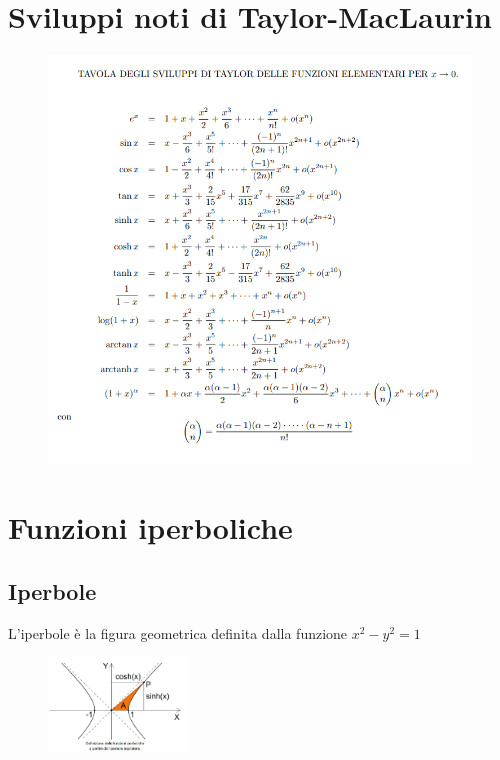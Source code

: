 \documentclass{report}
\begin{document}
\section{Sviluppi noti di Taylor-MacLaurin}
    \begin{center}
        \begin{figure}[H]
            \includegraphics[width = \textwidth]{taylor.png}
        \end{figure}
    \end{center}
\newpage
\section{Funzioni iperboliche}
    \subsection{Iperbole}
        L'iperbole è la figura geometrica definita dalla funzione $x^2 - y^2 = 1$
        \begin{center}
            \begin{figure}[H]
                \includegraphics[width = 0.33\textwidth]{iperbole.png}
            \end{figure}
        \end{center}
\end{document}
